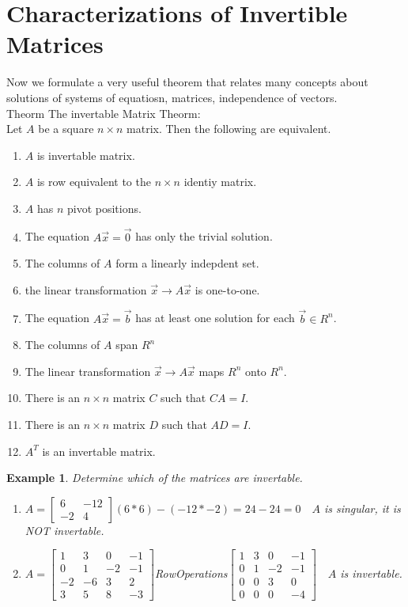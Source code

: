 \documentclass[a4paper,12pt,openany]{book}
\theoremstyle{defn}
\theoremstyle{expl}
\newtheorem{expl}{Example}[section]
\begin{document}
\section{Characterizations of Invertible Matrices}
\noindent Now we formulate a very useful theorem that relates many concepts about solutions of systems of equatiosn, matrices, independence of vectors.\\
Theorm The invertable Matrix Theorm:\\
Let $A$ be a square $n\times n$ matrix. Then the following are equivalent.\\
\begin{enumerate}
\item $A$ is invertable matrix.
\item $A$ is row equivalent to the $n\times n$ identiy matrix.
\item $A$ has $n$ pivot positions.
\item The equation $A\vec{x}=\vec{0}$ has only the trivial solution.
\item The columns of $A$ form a linearly indepdent set.
\item the linear transformation $\vec{x}\rightarrow A\vec{x}$ is one-to-one.
\item The equation $A\vec{x}=\vec{b}$ has at least one solution for each $\vec{b}\in R^n$.
\item The columns of $A$ span $R^n$
\item The linear transformation $\vec{x}\rightarrow A\vec{x}$ maps $R^n$ onto $R^n$.
\item There is an $n\times n$ matrix $C$ such that $CA=I$.
\item There is an $n\times n$ matrix $D$ such that $AD=I$.
\item $A^T$ is an invertable matrix.
\end{enumerate}
\begin{expl}\textup{Determine which of the matrices are invertable.\\}
\begin{enumerate}
\item $A=\left[\begin{array}{cc}6&-12\\-2&4\end{array}\right] (6*6)-(-12*-2)=24-24=0\quad A$ is singular, it is NOT invertable.
\item $A=\left[\begin{array}{cccc}1&3&0&-1\\0&1&-2&-1\\-2&-6&3&2\\3&5&8&-3\end{array}\right]$RowOperations$\left[\begin{array}{cccc}1&3&0&-1\\0&1&-2&-1\\0&0&3&0\\0&0&0&-4\end{array}\right]\quad A$ is invertable.
\end{enumerate}
\end{expl}
\end{document}
